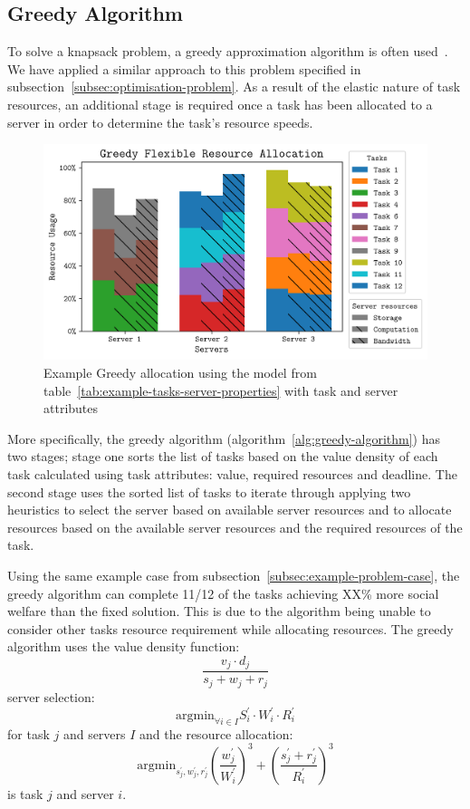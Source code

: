\subsection{Greedy Algorithm}
\label{subsec:greedy-algorithm}
To solve a knapsack problem, a greedy approximation algorithm is often used~\cite{sahni1975approximate}. We have
applied a similar approach to this problem specified in subsection~\ref{subsec:optimisation-problem}. As a result of
the elastic nature of task resources, an additional stage is required once a task has been allocated to a server in
order to determine the task's resource speeds.

\begin{figure}
    \centering
    \includegraphics[width=\linewidth]{figs/allocation/greedy_flexible_resource_allocation.png}
    \caption{Example Greedy allocation using the model from table~\ref{tab:example-tasks-server-properties}
             with task and server attributes}
    \label{fig:example-greedy-allocation}
\end{figure}

More specifically, the greedy algorithm (algorithm~\ref{alg:greedy-algorithm}) has two stages; stage one sorts the list
of tasks based on the value density of each task calculated using task attributes: value, required resources and
deadline. The second stage uses the sorted list of tasks to iterate through applying two heuristics to select the
server based on available server resources and to allocate resources based on the available server resources and the
required resources of the task.

Using the same example case from subsection~\ref{subsec:example-problem-case}, the greedy algorithm can complete 11/12 of
the tasks achieving XX\% more social welfare than the fixed solution. This is due to the algorithm being unable to %
consider other tasks resource requirement while allocating resources. The greedy algorithm uses the value density function:
\[\frac{v_j \cdot d_j}{s_j + w_j + r_j}\] server selection:
 \[\text{argmin}_{\forall i \in I} S^{'}_i \cdot W^{'}_i \cdot R^{'}_i\] for task $j$ and servers $I$ and the resource allocation:
\[\text{argmin}_{s^{'}_j, w^{'}_j, r^{'}_j} \left(\frac{w^{'}_j}{W^{'}_i}\right)^3 + \left(\frac{s^{'}_j + r^{'}_j}{R^{'}_i}\right)^3\]
is task $j$ and server $i$.


